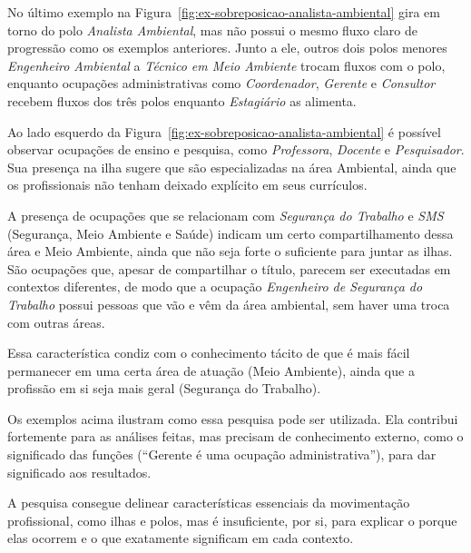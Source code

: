 \documentclass[12pt,a4paper]{article}
\begin{document}
No último exemplo na Figura~\ref{fig:ex-sobreposicao-analista-ambiental} gira em torno do polo \textit{Analista Ambiental}, mas não possui o mesmo fluxo claro de progressão como os exemplos anteriores. Junto a ele, outros dois polos menores \textit{Engenheiro Ambiental} a \textit{Técnico em Meio Ambiente} trocam fluxos com o polo, enquanto ocupações administrativas como \textit{Coordenador}, \textit{Gerente} e \textit{Consultor} recebem fluxos dos três polos enquanto \textit{Estagiário} as alimenta.

Ao lado esquerdo da Figura~\ref{fig:ex-sobreposicao-analista-ambiental} é possível observar ocupações de ensino e pesquisa, como \textit{Professora}, \textit{Docente} e \textit{Pesquisador}. Sua presença na ilha sugere que são especializadas na área Ambiental, ainda que os profissionais não tenham deixado explícito em seus currículos.

A presença de ocupações que se relacionam com \textit{Segurança do Trabalho} e \textit{SMS} (Segurança, Meio Ambiente e Saúde) indicam um certo compartilhamento dessa área e Meio Ambiente, ainda que não seja forte o suficiente para juntar as ilhas. São ocupações que, apesar de compartilhar o título, parecem ser executadas em contextos diferentes, de modo que a ocupação \textit{Engenheiro de Segurança do Trabalho} possui pessoas que vão e vêm da área ambiental, sem haver uma troca com outras áreas.

Essa característica condiz com o conhecimento tácito de que é mais fácil permanecer em uma certa área de atuação (Meio Ambiente), ainda que a profissão em si seja mais geral (Segurança do Trabalho).

Os exemplos acima ilustram como essa pesquisa pode ser utilizada. Ela contribui fortemente para as análises feitas, mas precisam de conhecimento externo, como o significado das funções (\enquote{Gerente é uma ocupação administrativa}), para dar significado aos resultados.

A pesquisa consegue delinear características essenciais da movimentação profissional, como ilhas e polos, mas é insuficiente, por si, para explicar o porque elas ocorrem e o que exatamente significam em cada contexto.
\end{document}
